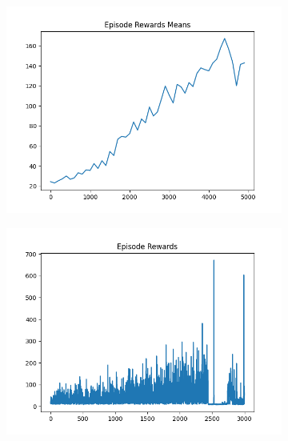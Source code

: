 \begin{figure}[H]
\begin{subfigure}{.47\linewidth}
        \includegraphics[width=\textwidth]{pole/2024-06-13_20-39-12_dqn_cartpole_episode_rewards_means.png}
    \end{subfigure}
    \begin{subfigure}{.47\linewidth}
        \centering
        \includegraphics[width=\textwidth]{pole/2024-06-13_18-50-05_dqn_cartpole_episode_rewards.png}
    \end{subfigure}
\end{figure}
